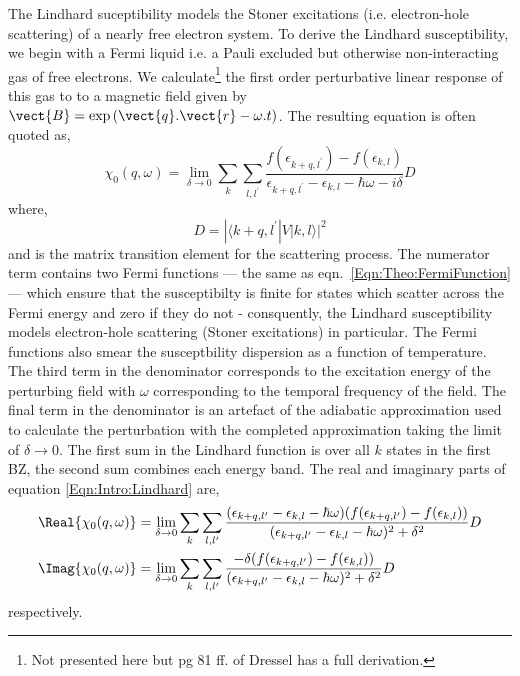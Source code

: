The Lindhard suceptibility models the Stoner excitations (i.e. electron-hole scattering) of a nearly free electron system. To derive the Lindhard susceptibility, we begin with a Fermi liquid i.e. a Pauli excluded but otherwise non-interacting gas of free electrons. We calculate\footnote{Not presented here but pg 81 ff. of Dressel \cite{Dressel2002} has a full derivation.} the first order perturbative linear response of this gas to to a magnetic field given by $\vect{B}=\exp{(\vect{q}.\vect{r} - \omega.t})$. The resulting equation is often quoted as,
\begin{equation}
    \chi_0(q, \omega) = \lim_{\delta \to 0} \sum_{k}\sum_{l,l^\prime}\frac{f(\epsilon_{k+q,l^\prime}) - f(\epsilon_{k,l})}{\epsilon_{k+q,l^\prime} - \epsilon_{k,l} - \hbar\omega - i\delta}D
    \label{Eqn:Intro:Lindhard}
\end{equation}
where,
\begin{equation}
    D = |\langle k+q,l^\prime|V|k,l \rangle|^2
\end{equation}
and is the matrix transition element for the scattering process. The numerator term contains two Fermi functions --- the same as eqn.~\ref{Eqn:Theo:FermiFunction} --- which ensure that the susceptibilty is finite for states which scatter across the Fermi energy and zero if they do not - consquently, the Lindhard susceptibility models electron-hole scattering (Stoner excitations) in particular. The Fermi functions also smear the susceptbility dispersion as a function of temperature. The third term in the denominator corresponds to the excitation energy of the perturbing field with $\omega$ corresponding to the temporal frequency of the field. The final term in the denominator is an artefact of the adiabatic approximation used to calculate the perturbation with the completed approximation taking the limit of $\delta \to 0$. The first sum in the Lindhard function is over all $k$ states in the first \ac{BZ}, the second sum combines each energy band. The real and imaginary parts of equation \ref{Eqn:Intro:Lindhard} are,
\begin{align}
\Real\{\chi_0(q, \omega)\} &= \lim_{\delta \to 0} \sum_{k}\sum_{l, l^\prime}\frac{(\epsilon_{k+q,l^\prime} - \epsilon_{k,l} - \hbar\omega) (f(\epsilon_{k+q,l^\prime}) - f(\epsilon_{k,l}))}{(\epsilon_{k+q,l^\prime} - \epsilon_{k,l} - \hbar\omega)^2 + \delta^2}D \\
\Imag\{\chi_0(q, \omega)\} &= \lim_{\delta \to 0} \sum_{k}\sum_{l, l^\prime}\frac{-\delta (f(\epsilon_{k+q,l^\prime}) - f(\epsilon_{k,l}))}{(\epsilon_{k+q,l^\prime} - \epsilon_{k,l} - \hbar\omega)^2 + \delta^2}D\\
\end{align}
respectively.

